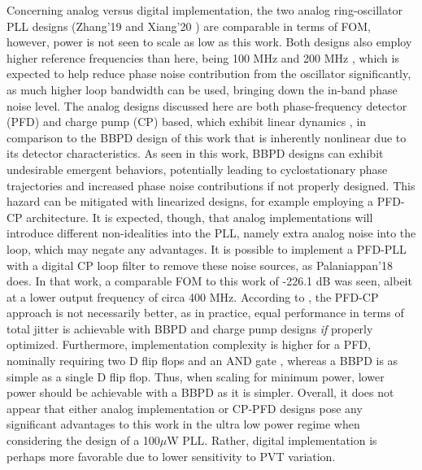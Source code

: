 Concerning analog versus digital implementation, the two analog ring-oscillator PLL designs (Zhang'19 \cite{Zhang2019} and Xiang'20 \cite{Xiang2020}) are comparable in terms of FOM, however, power is not seen to scale as low as this work. Both designs also employ higher reference frequencies than here, being 100 MHz \cite{Zhang2019} and 200 MHz \cite{Xiang2020}, which is expected to help reduce phase noise contribution from the oscillator significantly, as much higher loop bandwidth can be used, bringing down the in-band phase noise level. The analog designs discussed here are both phase-frequency detector (PFD) and charge pump (CP) based, which exhibit linear dynamics \cite{Razavi2020}, in comparison to the BBPD design of this work that is inherently nonlinear due to its detector characteristics. As seen in this work, BBPD designs can exhibit undesirable emergent behaviors, potentially leading to cyclostationary phase trajectories and increased phase noise contributions if not properly designed. This hazard can be mitigated with linearized designs, for example employing a PFD-CP architecture. It is expected, though, that analog implementations will introduce different non-idealities into the PLL, namely extra analog noise into the loop, which may negate any advantages. It is possible to implement a PFD-PLL with a digital CP loop filter to remove these noise sources, as Palaniappan'18 \cite{Palaniappan2018} does. In that work, a comparable FOM to this work of -226.1 dB was seen, albeit at a lower output frequency of circa 400 MHz. According to \cite{xu_abidi_2017}, the PFD-CP approach is not necessarily better, as in practice, equal performance in terms of total jitter is achievable with BBPD and charge pump designs \textit{if} properly optimized. Furthermore, implementation complexity is higher for a PFD, nominally requiring two D flip flops and an AND gate \cite{Razavi2020}, whereas a BBPD is as simple as a single D flip flop. Thus, when scaling for minimum power, lower power should be achievable with a BBPD as it is simpler. Overall, it does not appear that either analog implementation or CP-PFD designs pose any significant advantages to this work in the ultra low power regime when considering the design of a 100$\mu$W PLL. Rather, digital implementation is perhaps more favorable due to lower sensitivity to PVT variation.

